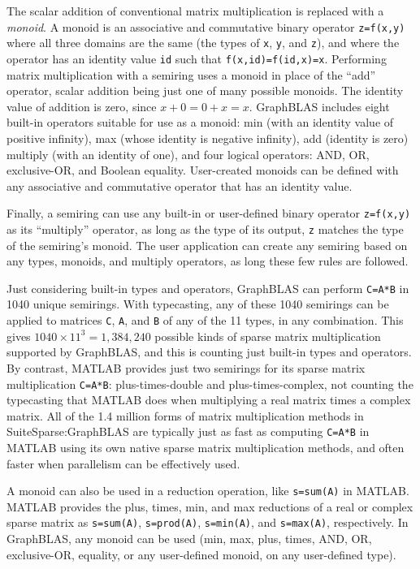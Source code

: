 \documentclass[12pt]{article}
\begin{document}
The scalar addition of conventional matrix multiplication is replaced with a
{\em monoid}.  A monoid is an associative and commutative binary operator
\verb'z=f(x,y)' where all three domains are the same (the types of \verb'x',
\verb'y', and \verb'z'), and where the operator has an identity value \verb'id'
such that \verb'f(x,id)=f(id,x)=x'.  Performing matrix multiplication with a
semiring uses a monoid in place of the ``add'' operator, scalar addition being
just one of many possible monoids.  The identity value of addition is zero,
since $x+0=0+x=x$.   GraphBLAS includes eight built-in operators suitable for
use as a monoid: min (with an identity value of positive infinity), max (whose
identity is negative infinity), add (identity is zero) multiply (with an
identity of one), and four logical operators: AND, OR, exclusive-OR, and
Boolean equality.  User-created monoids can be defined with any associative and
commutative operator that has an identity value.

Finally, a semiring can use any built-in or user-defined binary operator
\verb'z=f(x,y)' as its ``multiply'' operator, as long as the type of its
output, \verb'z' matches the type of the semiring's monoid.
The user application can create any semiring based on any types, monoids,
and multiply operators, as long these few rules are followed.

Just considering built-in types and operators, GraphBLAS can perform
\verb'C=A*B' in 1040 unique semirings.  With typecasting, any of these 1040
semirings can be applied to matrices \verb'C', \verb'A', and \verb'B' of any of
the 11 types, in any combination.  This gives $1040 \times 11^3 = 1,384,240$
possible kinds of sparse matrix multiplication supported by GraphBLAS, and this
is counting just built-in types and operators.  By contrast, MATLAB provides
just two semirings for its sparse matrix multiplication \verb'C=A*B':
plus-times-double and plus-times-complex, not counting the typecasting that
MATLAB does when multiplying a real matrix times a complex matrix.  All of the
1.4 million forms of matrix multiplication methods in SuiteSparse:GraphBLAS are
typically just as fast as computing \verb'C=A*B' in MATLAB using its own native
sparse matrix multiplication methods, and often faster when parallelism can
be effectively used.

A monoid can also be used in a reduction operation, like \verb's=sum(A)' in
MATLAB.  MATLAB provides the plus, times, min, and max reductions of a real or
complex sparse matrix as \verb's=sum(A)',  \verb's=prod(A)', \verb's=min(A)',
and \verb's=max(A)', respectively.  In GraphBLAS, any monoid can be used (min,
max, plus, times, AND, OR, exclusive-OR, equality, or any user-defined monoid,
on any user-defined type).
\end{document}
